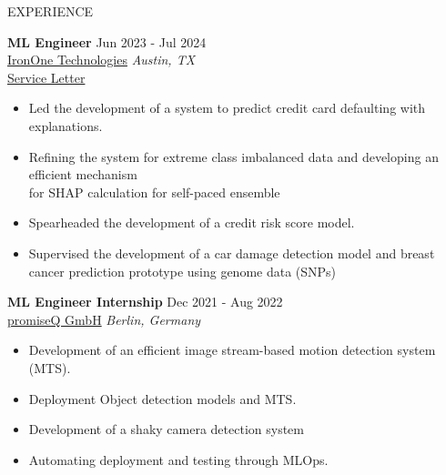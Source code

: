 \documentclass{resume} %
\begin{document}

\begin{rSection}{EXPERIENCE}

\textbf{ML Engineer} \hfill Jun 2023 - Jul 2024\\
\href{https://irononeailabs.com}{IronOne Technologies} \hfill \textit{Austin, TX} \\
\href{https://drive.google.com/file/d/18g-9RbiW1LLCa3f9J8CWWccwRikGCOnR/view?usp=sharing}{Service Letter}
 \begin{itemize}
    \itemsep -3pt {} 
     \item Led the development of a system to predict credit card defaulting with explanations.
     \item Refining the system for extreme class imbalanced data and developing an efficient mechanism \\ for SHAP calculation for self-paced ensemble
    \item Spearheaded the development of a credit risk score model.
    \item Supervised the development of a car damage detection model and breast cancer prediction prototype using genome data (SNPs)
 \end{itemize}
 
\textbf{ML Engineer Internship} \hfill Dec 2021 - Aug 2022\\
\href{https://www.promiseq.com}{promiseQ GmbH} \hfill \textit{Berlin, Germany}
 \begin{itemize}
    \itemsep -3pt {} 
     \item Development of an efficient image stream-based motion detection system (MTS).
     \item Deployment Object detection models and MTS.
     \item Development of a shaky camera detection system
     \item Automating deployment and testing through MLOps.
 \end{itemize}

\end{rSection} 

\end{document}
